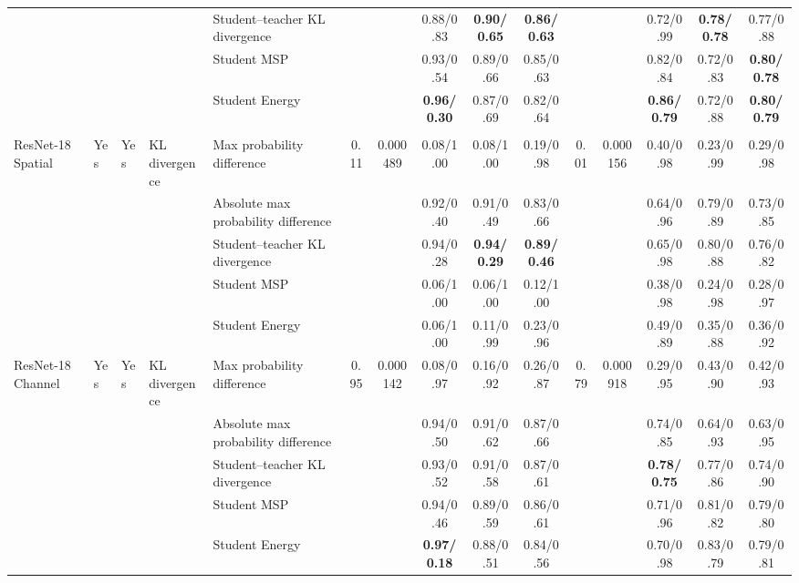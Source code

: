 \documentclass[border=2pt]{standalone}
\begin{document}
\begin{tabular}{lllllcccccccccc}
 &  &  &  & Student--teacher KL divergence &  &  & 0.88/0.83 & \textbf{0.90/0.65} & \textbf{0.86/0.63} &  &  & 0.72/0.99 & \textbf{0.78/0.78} & 0.77/0.88 \\
 &  &  &  & Student MSP &  &  & 0.93/0.54 & 0.89/0.66 & 0.85/0.63 &  &  & 0.82/0.84 & 0.72/0.83 & \textbf{0.80/0.78} \\
 &  &  &  & Student Energy &  &  & \textbf{0.96/0.30} & 0.87/0.69 & 0.82/0.64 &  &  & \textbf{0.86/0.79} & 0.72/0.88 & \textbf{0.80/0.79} \\
\addlinespace
\rowcolor{resnet18blue}
\multicolumn{15}{l}{\textbf{ResNet-18 teacher extract from aggressive clipping table}} \\
\rowcolor{resnet18blue}
ResNet-18 Spatial & Yes & Yes & KL divergence & Max probability difference & 0.11 & 0.000489 & 0.08/1.00 & 0.08/1.00 & 0.19/0.98 & 0.01 & 0.000156 & 0.40/0.98 & 0.23/0.99 & 0.29/0.98 \\
\rowcolor{resnet18blue}
 &  &  &  & Absolute max probability difference &  &  & 0.92/0.40 & 0.91/0.49 & 0.83/0.66 &  &  & 0.64/0.96 & 0.79/0.89 & 0.73/0.85 \\
\rowcolor{resnet18blue}
 &  &  &  & Student--teacher KL divergence &  &  & 0.94/0.28 & \textbf{0.94/0.29} & \textbf{0.89/0.46} &  &  & 0.65/0.98 & 0.80/0.88 & 0.76/0.82 \\
\rowcolor{resnet18blue}
 &  &  &  & Student MSP &  &  & 0.06/1.00 & 0.06/1.00 & 0.12/1.00 &  &  & 0.38/0.98 & 0.24/0.98 & 0.28/0.97 \\
\rowcolor{resnet18blue}
 &  &  &  & Student Energy &  &  & 0.06/1.00 & 0.11/0.99 & 0.23/0.96 &  &  & 0.49/0.89 & 0.35/0.88 & 0.36/0.92 \\
\rowcolor{resnet18blue}
ResNet-18 Channel & Yes & Yes & KL divergence & Max probability difference & 0.95 & 0.000142 & 0.08/0.97 & 0.16/0.92 & 0.26/0.87 & 0.79 & 0.000918 & 0.29/0.95 & 0.43/0.90 & 0.42/0.93 \\
\rowcolor{resnet18blue}
 &  &  &  & Absolute max probability difference &  &  & 0.94/0.50 & 0.91/0.62 & 0.87/0.66 &  &  & 0.74/0.85 & 0.64/0.93 & 0.63/0.95 \\
\rowcolor{resnet18blue}
 &  &  &  & Student--teacher KL divergence &  &  & 0.93/0.52 & 0.91/0.58 & 0.87/0.61 &  &  & \textbf{0.78/0.75} & 0.77/0.86 & 0.74/0.90 \\
\rowcolor{resnet18blue}
 &  &  &  & Student MSP &  &  & 0.94/0.46 & 0.89/0.59 & 0.86/0.61 &  &  & 0.71/0.96 & 0.81/0.82 & 0.79/0.80 \\
\rowcolor{resnet18blue}
 &  &  &  & Student Energy &  &  & \textbf{0.97/0.18} & 0.88/0.51 & 0.84/0.56 &  &  & 0.70/0.98 & 0.83/0.79 & 0.79/0.81 \\
\bottomrule
\end{tabular}
\end{document}

